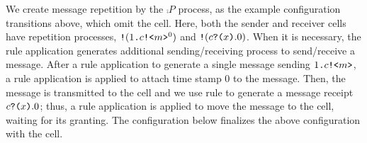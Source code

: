 We create message repetition by the $\comp{P}$ process, 
as the example configuration transitions above, which omit the  cell.
Here, both the sender and receiver cells have repetition processes, 
$\texttt{!}(1\texttt{.}c\texttt{!<}m\texttt{>}^0)$ and $\texttt{!}(c\texttt{?(}x\texttt{)}.0)$.
When it is necessary, the  rule application generates additional sending/receiving process to send/receive a message.
After a  rule application to generate a single message sending $1\texttt{.}c\texttt{!<}m\texttt{>}$, 
a  rule application is applied to attach time stamp $0$ to the message.
Then, the message is transmitted to the  cell
and we use rule  to generate a message receipt $c\texttt{?(}x\texttt{)}.0$;
thus, a  rule application is applied to move the message to the  cell, waiting for its granting.
The configuration below finalizes the above configuration with the  cell.

